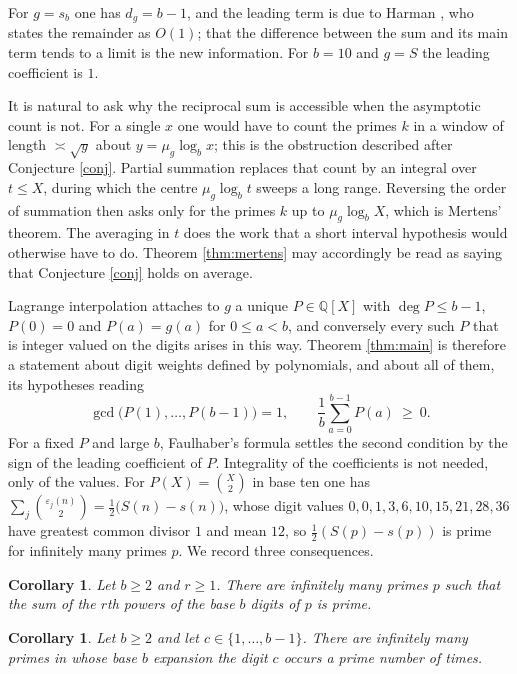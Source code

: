 \documentclass[11pt,reqno]{amsart}
\theoremstyle{plain}
\newtheorem{corollary}[theorem]{Corollary}
\theoremstyle{definition}
\newcommand{\Q}{\mathbb{Q}}
\begin{document}
For $g=s_b$ one has $d_g=b-1$, and the leading term is due to Harman \cite[Theorems 2 and 3]{harman}, who states the remainder as $O(1)$; that the difference between the sum and its main term tends to a limit is the new information. For $b=10$ and $g=S$ the leading coefficient is $1$.

It is natural to ask why the reciprocal sum is accessible when the asymptotic count is not. For a single $x$ one would have to count the primes $k$ in a window of length $\asymp\sqrt{y}$ about $y=\mu_g\log_bx$; this is the obstruction described after Conjecture \ref{conj}. Partial summation replaces that count by an integral over $t\le X$, during which the centre $\mu_g\log_bt$ sweeps a long range. Reversing the order of summation then asks only for the primes $k$ up to $\mu_g\log_bX$, which is Mertens' theorem. The averaging in $t$ does the work that a short interval hypothesis would otherwise have to do. Theorem \ref{thm:mertens} may accordingly be read as saying that Conjecture \ref{conj} holds on average.

Lagrange interpolation attaches to $g$ a unique $P\in\Q[X]$ with $\deg P\le b-1$, $P(0)=0$ and $P(a)=g(a)$ for $0\le a<b$, and conversely every such $P$ that is integer valued on the digits arises in this way. Theorem \ref{thm:main} is therefore a statement about digit weights defined by polynomials, and about all of them, its hypotheses reading
\[
\gcd\big(P(1),\dots,P(b-1)\big)=1,\qquad \frac1b\sum_{a=0}^{b-1}P(a)\ \ge\ 0 .
\]
For a fixed $P$ and large $b$, Faulhaber's formula settles the second condition by the sign of the leading coefficient of $P$. Integrality of the coefficients is not needed, only of the values. For $P(X)=\binom{X}{2}$ in base ten one has $\sum_j\binom{\varepsilon_j(n)}{2}=\frac12\big(S(n)-s(n)\big)$, whose digit values $0,0,1,3,6,10,15,21,28,36$ have greatest common divisor $1$ and mean $12$, so $\frac12(S(p)-s(p))$ is prime for infinitely many primes $p$. We record three consequences.

\begin{corollary}\label{cor:powers}
Let $b\ge2$ and $r\ge1$. There are infinitely many primes $p$ such that the sum of the $r$th powers of the base $b$ digits of $p$ is prime.
\end{corollary}

\begin{corollary}\label{cor:count}
Let $b\ge2$ and let $c\in\{1,\dots,b-1\}$. There are infinitely many primes in whose base $b$ expansion the digit $c$ occurs a prime number of times.
\end{corollary}
\end{document}
